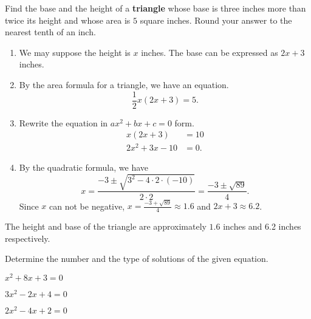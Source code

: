 	\begin{example}
		Find the base and the height of a \textbf{triangle} whose base is three inches more than twice its height and whose area is $5$ square inches. Round your answer to the nearest tenth of an inch.
	\end{example}
	\begin{solution}\mbox{}\vspace{-0.25em}
		\begin{enumerate}[label={\textbf{\textup{Step \arabic*.}}~}]
			\item We may suppose the height is $x$ inches. The base can be expressed as $2x+3$ inches.
			\item By the area formula for a triangle, we have an equation.
			      \[\frac12 x(2x+3)=5.\]
			\item Rewrite the equation in $ax^2+bx+c=0$ form.
			      \[
				      \begin{split}
					      x(2x+3)&=10\\
					      2x^2+3x-10&=0.
				      \end{split}
			      \]
			\item By the quadratic formula, we have
				  $$
				  x=\frac{-3\pm\sqrt{3^2-4\cdot 2\cdot (-10)}}{2\cdot 2}=\frac{-3\pm \sqrt{89}}{4}.
				  $$				  
			      Since $x$ can not be negative, $x=\frac{-3+\sqrt{89}}{4}\approx 1.6$ and $2x+3\approx 6.2$.
		\end{enumerate}
		The height and base of the triangle are approximately $1.6$ inches and 6.2 inches respectively.
	\end{solution}


\newpage

\begin{exercise}
	Determine the number and the type of solutions of the given equation.\\
	\begin{enumerate*}[label={(\arabic*)~}]
		\item $x^2+8x+3=0$
		\item $3x^2-2x+4=0$
		\item $2x^2-4x+2=0$
		\hfill\null
	\end{enumerate*}
\end{exercise}

\vfill
\begin{center} \hfill
\end{center}


